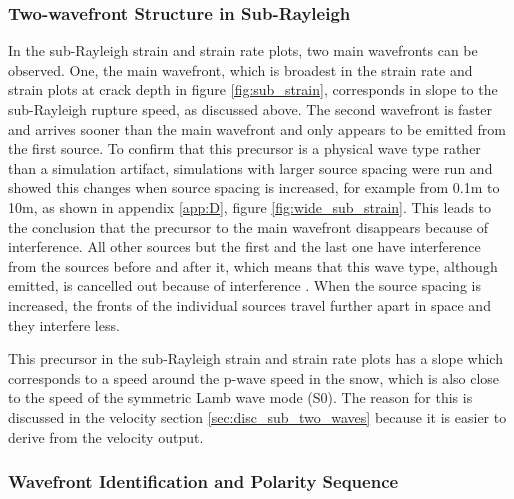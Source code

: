 \subsubsection{Two-wavefront Structure in Sub-Rayleigh}
In the sub-Rayleigh strain and strain rate plots, two main wavefronts can be observed. One, the main wavefront, which is broadest in the strain rate and strain plots at crack depth in figure \ref{fig:sub_strain}, corresponds in slope to the sub-Rayleigh rupture speed, as discussed above. The second wavefront is faster and arrives sooner than the main wavefront and only appears to be emitted from the first source. To confirm that this precursor is a physical wave type rather than a simulation artifact, simulations with larger source spacing were run and showed this changes when source spacing is increased, for example from 0.1m to 10m, as shown in appendix \ref{app:D}, figure \ref{fig:wide_sub_strain}. This leads to the conclusion that the precursor to the main wavefront disappears because of interference. All other sources but the first and the last one have interference from the sources before and after it, which means that this wave type, although emitted, is cancelled out because of interference \parencite{madariagaDynamicsExpandingCircular1976}. When the source spacing is increased, the fronts of the individual sources travel further apart in space and they interfere less. \par

This precursor in the sub-Rayleigh strain and strain rate plots has a slope which corresponds to a speed around the p-wave speed in the snow, which is also close to the speed of the symmetric Lamb wave mode (S0). The reason for this is discussed in the velocity section \ref{sec:disc_sub_two_waves} because it is easier to derive from the velocity output. \par

\subsubsection{Wavefront Identification and Polarity Sequence}

